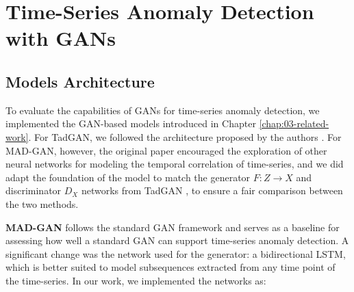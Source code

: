 \chapter{Time-Series Anomaly Detection with GANs}
\label{chap:04-time-series-anomaly-detection-with-gans}

\section{Models Architecture}
\label{sec:04-model-architecture}

To evaluate the capabilities of GANs for time-series anomaly detection, we implemented the GAN-based models introduced in Chapter \ref{chap:03-related-work}. For TadGAN, we followed the architecture proposed by the authors \cite{geiger2020tadgan}. For MAD-GAN, however, the original paper encouraged the exploration of other neural networks for modeling the temporal correlation of time-series, and we did adapt the foundation of the model to match the generator $F: Z \to X$ and discriminator $D_X$ networks from TadGAN \cite{geiger2020tadgan}, to ensure a fair comparison between the two methods.

\textbf{MAD-GAN} follows the standard GAN framework and serves as a baseline for assessing how well a standard GAN can support time-series anomaly detection. A significant change was the network used for the generator: a bidirectional LSTM, which is better suited to model subsequences extracted from any time point of the time-series. In our work, we implemented the networks as: 

